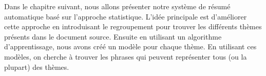 \documentclass[a4paper,12pt,oneside]{../use/ESIthesis}
\begin{document}
Dans le chapitre suivant, nous allons présenter notre système de résumé automatique basé sur l'approche statistique. 
L'idée principale est d'améliorer cette approche en introduisant le regroupement pour trouver les différents thèmes présents dans le document source. 
Ensuite en utilisant un algorithme d'apprentissage, nous avons créé un modèle pour chaque thème. 
En utilisant ces modèles, on cherche à trouver les phrases qui peuvent représenter tous (ou la plupart) des thèmes. 

\ifx\wholebook\relax\else
 \cleardoublepage
 
\end{document}
